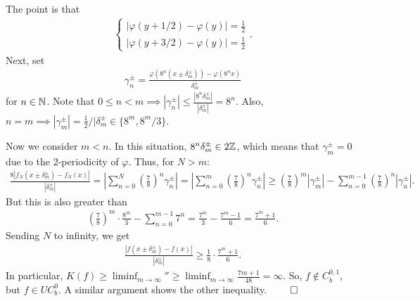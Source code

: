 \documentclass{report}
\begin{document}
The point is that 
\begin{align*}
    \begin{cases}
        |\varphi(y + 1/2) - \varphi(y)| = \frac 12 \\
        |\varphi(y + 3/2) - \varphi(y)| = \frac 12
    \end{cases}.
\end{align*}
Next, set 
\begin{align*}
    \gamma_n^\pm = \frac{\varphi(8^n(x \pm \delta^{\pm}_m)) - \varphi(8^n x)}{\delta^{\pm}_m}
\end{align*}
for $n \in \NN$. Note that $0 \leq n < m \implies |\gamma_n^\pm| \leq \frac{|8^n \delta_m^\pm|}{|\delta^{\pm}_m|} = 8^n$. Also, $n = m \implies |\gamma_m^\pm| = \frac 12 / |\delta^{\pm}_m \in \{8^m, 8^m/3\}$. 

\noindent Now we consider $m < n$. In this situation, $8^n \delta_m^\pm \in 2\ZZ$, which means that $\gamma_m^\pm = 0$ due to the 2-periodicity of $\varphi$. Thus, for $N > m$:
\begin{align*}
    \frac{8|f_N(x \pm \delta_m^\pm) - f_N(x)|}{|\delta_m^\pm|} = \left| \sum_{n=0}^N \left( \frac 78 \right)^n \gamma_n^\pm\right| = \left| \sum_{n=0}^m \left(\frac 78\right)^n \gamma_n^\pm \right| \geq \left(\frac 78 \right)^m |\gamma_m^\pm| - \sum_{n=0}^{m-1} \left( \frac 78\right)^n |\gamma_n^\pm|.
\end{align*}
But this is also greater than
\begin{align*}
    \left( \frac 78 \right)^m \cdot \frac{8^m}{3} - \sum_{n=0}^{m-1} 7^n = \frac{7^m}{3} - \frac{7^m - 1}{6} = \frac{7^m +1}{6}.
\end{align*}
Sending $N$ to infinity, we get 
\begin{align*}
    \frac{|f(x \pm \delta_m^\pm) - f(x)|}{|\delta_m^\pm|} \geq \frac 18 \cdot \frac{7^m + 1}{6}.
\end{align*}
In particular, $K(f) \geq \liminf_{m \to\infty} '' \geq \liminf_{m \to \infty} \frac{7m + 1}{48} = \infty$. So, $f \notin C^{0,1}_b$, but $f \in UC_b^0$. A similar argument shows the other inequality.
$\hfill \qed$
\newpage
{}
\end{document}
